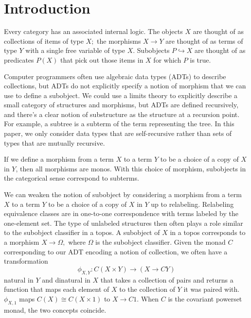 \documentclass[sigplan,9pt,review,anonymous]{acmart}\settopmatter{printfolios=true,printccs=false,printacmref=false}
\newcommand{\maps}{\colon}
\newcommand{\into}{\hookrightarrow}
\begin{document}


\maketitle


\section{Introduction}
Every category has an associated internal logic.  The objects $X$ are thought of as collections of items of type $X;$ the morphisms $X \to Y$ are thought of as terms of type $Y$ with a single free variable of type $X.$  Subobjects $P \into X$ are thought of as predicates $P(X)$ that pick out those items in $X$ for which $P$ is true.

Computer programmers often use algebraic data types (ADTs) to describe collections, but ADTs do not explicitly specify a notion of morphism that we can use to define a subobject.  We could use a limits theory to explicitly describe a small category of structures and morphisms, but ADTs are defined recursively, and there's a clear notion of substructure as the structure at a recursion point.  For example, a subtree is a subterm of the term representing the tree.  In this paper, we only consider data types that are self-recursive rather than sets of types that are mutually recursive.

If we define a morphism from a term $X$ to a term $Y$ to be a choice of a copy of $X$ in $Y$, then all morphisms are monos.  With this choice of morphism, subobjects in the categorical sense correspond to subterms.

We can weaken the notion of subobject by considering a morphism from a term $X$ to a term $Y$ to be a choice of a copy of $X$ in $Y$ up to relabeling.  Relabeling equivalence classes are in one-to-one correspondence with terms labeled by the one-element set.  The type of unlabeled structures then often plays a role similar to the subobject classifier in a topos.  A subobject of $X$ in a topos corresponds to a morphism $X \to \Omega,$ where $\Omega$ is the subobject classifier.  Given the monad $C$ corresponding to our ADT encoding a notion of collection, we often have a transformation
\[ \phi_{X,Y}\maps C(X \times Y) \to (X \to CY) \]
natural in $Y$ and dinatural in $X$ that takes a collection of pairs and returns a function that maps each element of $X$ to the collection of $Y$ it was paired with.  $\phi_{X,1}$ maps $C(X) \cong C(X\times 1)$ to $X \to C1.$  When $C$ is the covariant powerset monad, the two concepts coincide.
\end{document}
